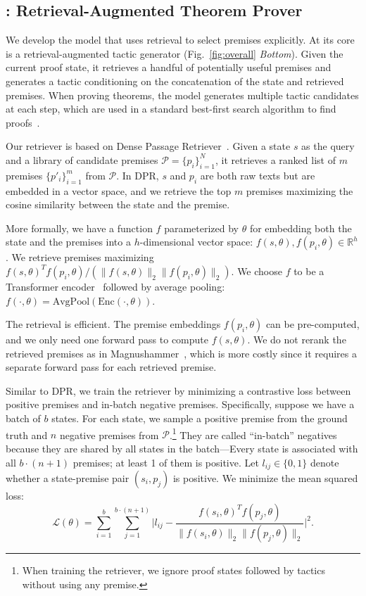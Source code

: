 \subsection{{\name}: Retrieval-Augmented Theorem Prover}
\label{sec:reprover}


We develop the {\name} model that uses retrieval to select premises explicitly. At its core is a retrieval-augmented tactic generator (Fig.~\ref{fig:overall} \emph{Bottom}). Given the current proof state, it retrieves a handful of potentially useful premises and generates a tactic conditioning on the concatenation of the state and retrieved premises. When proving theorems, the model generates multiple tactic candidates at each step, which are used in a standard best-first search algorithm to find proofs~\cite{han2022proof,zheng2022minif2f,polu2023formal,jiang2022thor}. 


Our retriever is based on Dense Passage Retriever~\cite{karpukhin2020dense}. Given a state $s$ as the query and a library of candidate premises $\mathcal{P} = \{p_i\}_{i=1}^{N}$, it retrieves a ranked list of $m$ premises $\{p'_i\}_{i=1}^{m}$ from $\mathcal{P}$. In DPR, $s$ and $p_i$ are both raw texts but are embedded in a vector space, and we retrieve the top $m$ premises maximizing the cosine similarity between the state and the premise.

More formally, we have a function $f$ parameterized by $\theta$ for embedding both the state and the premises into a $h$-dimensional vector space: $f(s, \theta), f(p_i, \theta) \in \mathbb{R}^{h}$. We retrieve premises maximizing $f(s, \theta)^T f(p_i, \theta)/(\lVert f(s, \theta) \rVert_2 \lVert f(p_i, \theta) \rVert_2)$. We choose $f$ to be a Transformer encoder~\cite{vaswani2017attention} followed by average pooling: $f(\cdot, \theta) = \textrm{AvgPool}(\textrm{Enc}(\cdot, \theta))$.

The retrieval is efficient. The premise embeddings $f(p_i, \theta)$ can be pre-computed, and we only need one forward pass to compute $f(s, \theta)$. We do not rerank the retrieved premises as in Magnushammer~\cite{mikula2023magnushammer}, which is more costly since it requires a separate forward pass for each retrieved premise.

Similar to DPR, we train the retriever by minimizing a contrastive loss between positive premises and in-batch negative premises. Specifically, suppose we have a batch of $b$ states. For each state, we sample a positive premise from the ground truth and $n$ negative premises from $\mathcal{P}$.\footnote{When training the retriever, we ignore proof states followed by tactics without using any premise.} They are called ``in-batch'' negatives because they are shared by all states in the batch---Every state is associated with all $b \cdot (n+1)$ premises; at least 1 of them is positive.
Let $l_{ij} \in \{0, 1\}$ denote whether a state-premise pair $(s_i, p_j)$ is positive. We minimize the mean squared loss: 
\begin{equation}
\mathcal{L(\theta)} = \sum_{i=1}^{b} \sum_{j=1}^{b \cdot (n + 1)} \Big\lvert l_{ij} - \frac{f(s_i, \theta)^T f(p_j, \theta)}{\lVert f(s_i, \theta) \rVert_2 \lVert f(p_j, \theta) \rVert_2} \Big\rvert^{2}.
\end{equation}


